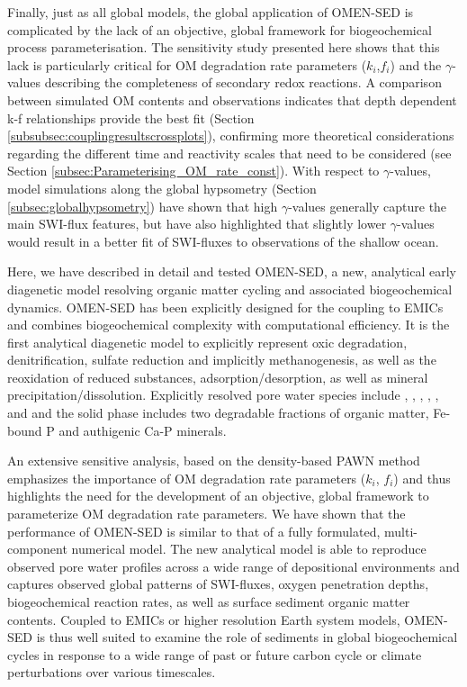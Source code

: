 \documentclass[gmd, manuscript]{copernicus}
\begin{document}
Finally, just as all global models, the global application of OMEN-SED is complicated by the lack of an objective, global framework for biogeochemical process parameterisation. The sensitivity study presented here shows that this lack is 
particularly critical for OM degradation rate parameters ($k_i$,$f_i$) and the $\gamma$-values describing the completeness of secondary redox reactions. A comparison between simulated OM contents and observations indicates that depth 
dependent k-f relationships provide the best fit (Section \ref{subsubsec:couplingresultscrossplots}), confirming more theoretical considerations regarding the different time and reactivity scales that need to be considered 
(see Section \ref{subsec:Parameterising_OM_rate_const}). With respect to $\gamma$-values, model simulations along the global hypsometry (Section \ref{subsec:globalhypsometry}) have shown that high $\gamma$-values generally capture 
the main SWI-flux features, but have also highlighted that slightly lower $\gamma$-values would result in a better fit of SWI-fluxes to observations of the shallow ocean. 

\conclusions  %
Here, we have described in detail and tested OMEN-SED, a new, analytical early diagenetic model resolving organic matter cycling and associated biogeochemical dynamics. OMEN-SED has been explicitly designed for the coupling to 
EMICs and combines biogeochemical complexity with computational efficiency. It is the first analytical diagenetic model to explicitly represent oxic degradation, denitrification, sulfate reduction and implicitly methanogenesis, 
as well as the reoxidation of reduced substances, adsorption/desorption, as well as mineral precipitation/dissolution. Explicitly resolved pore water species include , , , , ,  
and  and the solid phase includes two degradable fractions of organic matter, Fe-bound P and authigenic Ca-P minerals.

An extensive sensitive analysis, based on the density-based PAWN method \citep{pianosi_simple_2015} emphasizes the importance of OM degradation rate parameters ($k_i$, $f_i$) and thus highlights the need for the development of 
an objective, global framework to parameterize OM degradation rate parameters. We have shown that the performance of OMEN-SED is similar to that of a fully formulated, multi-component numerical model. The new analytical model 
is able to reproduce observed pore water profiles across a wide range of depositional environments and captures observed global patterns of SWI-fluxes, oxygen penetration depths, biogeochemical reaction rates, as well as surface 
sediment organic matter contents. Coupled to EMICs or higher resolution Earth system models, OMEN-SED is thus well suited to examine the role of sediments in global biogeochemical cycles in response to a wide range of past 
or future carbon cycle or climate perturbations over various timescales. 
\end{document}
